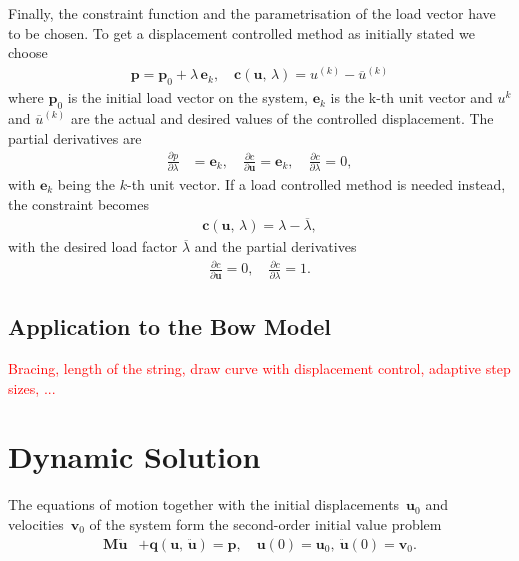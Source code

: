 Finally, the constraint function and the parametrisation of the load vector have to be chosen. To get a displacement controlled method as initially stated we choose
%
\begin{align}
\boldsymbol{p} = \boldsymbol{p}_{0} + \lambda\,\boldsymbol{e}_k,\quad\boldsymbol{c}(\boldsymbol{u},\,\lambda) = u^{(k)} - \overline{u}^{(k)}
\end{align}
%
where $\boldsymbol{p}_{0}$ is the initial load vector on the system, $\boldsymbol{e}_k$ is the k-th unit vector and $u^k$ and $\overline{u}^{(k)}$ are the actual and desired values of the controlled displacement. The partial derivatives are
%
\begin{align*}
\frac{\partial p}{\partial \lambda} &= \boldsymbol{e}_k,\quad
\frac{\partial c}{\partial \boldsymbol{u}} = \boldsymbol{e}_k,\quad
\frac{\partial c}{\partial \lambda} = 0,
\end{align*}
%
with $\boldsymbol{e}_k$ being the $k$-th unit vector. If a load controlled method is needed instead, the constraint becomes
%
\begin{align}
\boldsymbol{c}(\boldsymbol{u},\,\lambda) = \lambda - \overline{\lambda},
\end{align}
%
with the desired load factor $\overline{\lambda}$ and the partial derivatives
%
\begin{align*}
\frac{\partial c}{\partial \boldsymbol{u}} = 0,\quad
\frac{\partial c}{\partial \lambda} = 1.
\end{align*}

\newpage
\subsection{Application to the Bow Model}

\textcolor{red}{Bracing, length of the string, draw curve with displacement control, adaptive step sizes, ...}

\section{Dynamic Solution}

The equations of motion together with the initial displacements~$\boldsymbol{u}_0$ and velocities~$\boldsymbol{v}_0$ of the system form the second-order initial value problem
%
\begin{align}
\boldsymbol{M}\ddot{\boldsymbol{u}} &+ \boldsymbol{q}(\boldsymbol{u},\,\ddot{\boldsymbol{u}}) = \boldsymbol{p},\quad \boldsymbol{u}(0) = \boldsymbol{u}_0,\ \ddot{\boldsymbol{u}}(0) = \boldsymbol{v}_0.\label{eq:dynamics:system_equation}
\end{align}

